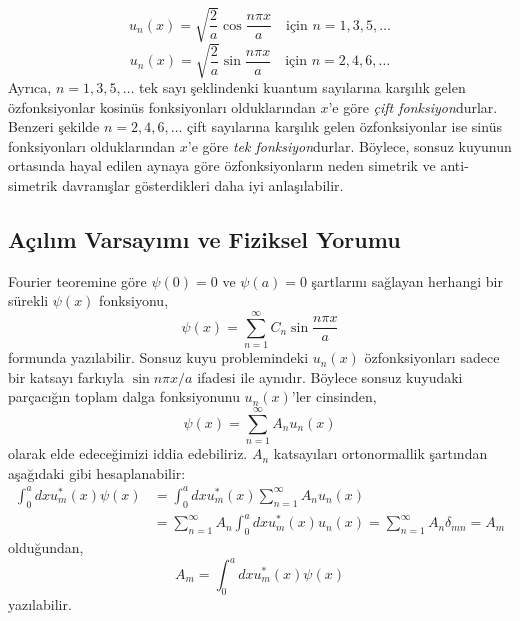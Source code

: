 \documentclass[a4paper,12pt, twoside]{article}
\begin{document}
\begin{enumerate}
	\begin{equation}
	u _ { n } ( x ) = \sqrt { \frac { 2 } { a } } \cos \frac { n \pi x } { a } \quad \text {için } n = 1,3,5 , \dots
	\end{equation}
	\begin{equation}
	u _ { n } ( x ) = \sqrt { \frac { 2 } { a } } \sin \frac { n \pi x } { a } \quad \text{için } n = 2,4,6, \dots
	\end{equation}
	Ayrıca, $n = 1,3,5, \dots$ tek sayı şeklindenki kuantum sayılarına karşılık gelen özfonksiyonlar kosinüs fonksiyonları olduklarından $x$'e göre \emph{çift fonksiyon}durlar. Benzeri şekilde $n = 2,4,6, \dots$ çift sayılarına karşılık gelen özfonksiyonlar ise sinüs fonksiyonları olduklarından  $x$'e göre \emph{tek fonksiyon}durlar. Böylece, sonsuz kuyunun ortasında hayal edilen aynaya göre özfonksiyonların neden simetrik ve anti-simetrik davranışlar gösterdikleri daha iyi anlaşılabilir.

	
\end{enumerate}




\subsection{Açılım Varsayımı ve Fiziksel Yorumu }

Fourier teoremine göre $\psi ( 0 ) = 0$ ve $\psi ( a ) = 0$ şartlarını sağlayan herhangi bir sürekli $\psi ( x )$ fonksiyonu,
\begin{equation}
\psi ( x ) = \sum _ { n = 1 } ^ { \infty } C _ { n } \sin \frac { n \pi x } { a }
\end{equation}
formunda yazılabilir. Sonsuz kuyu problemindeki $u_n(x)$ özfonksiyonları sadece bir katsayı farkıyla $\sin n \pi x / a$ ifadesi ile aynıdır. Böylece sonsuz kuyudaki parçacığın toplam dalga fonksiyonunu $u_n(x)$'ler cinsinden,
\begin{equation}
\psi ( x ) = \sum _ { n = 1 } ^ { \infty } A _ { n } u _ { n } ( x )
\end{equation}
olarak elde edeceğimizi iddia edebiliriz. $A_n$ katsayıları ortonormallik şartından aşağıdaki gibi hesaplanabilir:
\begin{equation}
\begin{aligned} \int _ { 0 } ^ { a } d x u _ { m } ^ { * } ( x ) \psi ( x ) & = \int _ { 0 } ^ { a } d x u _ { m } ^ { * } ( x ) \sum _ { n = 1 } ^ { \infty } A _ { n } u _ { n } ( x ) \\ & = \sum _ { n = 1 } ^ { \infty } A _ { n } \int _ { 0 } ^ { a } d x u _ { m } ^ { * } ( x ) u _ { n } ( x ) = \sum _ { n = 1 } ^ { \infty } A _ { n } \delta _ { m n } = A _ { m } \end{aligned}
\end{equation}
olduğundan,
\begin{equation}
A _ { m } = \int _ { 0 } ^ { a } d x u _ { m } ^ { * } ( x ) \psi ( x )
\end{equation}
yazılabilir.
\end{document}
